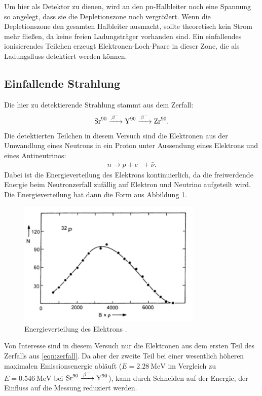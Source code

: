 Um hier als Detektor zu dienen, wird an den pn-Halbleiter noch eine Spannung so angelegt, dass sie die Depletionszone noch vergrößert.
Wenn die Depletionszone den gesamten Halbleiter ausmacht, sollte theoretisch kein Strom mehr fließen, da keine freien Ladungsträger vorhanden sind. Ein einfallendes ionisierendes Teilchen erzeugt Elektronen-Loch-Paare in dieser Zone, die als Ladungsfluss detektiert werden können.

\subsection{Einfallende Strahlung}

Die hier zu detektierende Strahlung stammt aus dem Zerfall:
\begin{align}
  \ce{Sr^{90} ->[$\beta^-$] Y^{90} ->[$\beta^-$] Zr^{90}}. \label{eqn:zerfall}
\end{align}
Die detektierten Teilchen in diesem Versuch sind die Elektronen aus der Umwandlung eines Neutrons in ein Proton unter Aussendung eines Elektrons und eines Antineutrinos:
\begin{align*}
  n \to p + e^- + \bar \nu.
\end{align*}
Dabei ist die Energieverteilung des Elektrons kontinuierlich, da die freiwerdende Energie beim Neutronzerfall zufällig auf Elektron und Neutrino aufgeteilt wird. Die Energieverteilung hat dann die Form aus Abbildung \ref{fig:elektronenergie}.
\begin{figure}
  \centering
  \includegraphics[height=6cm]{TimosAufrisse/elektronenenergie.png}
  \caption{Energieverteilung des Elektrons \cite{anleitung}.}
  \label{fig:elektronenergie}
\end{figure}
Von Interesse sind in diesem Versuch nur die Elektronen aus dem ersten Teil des Zerfalls aus \eqref{eqn:zerfall}. Da aber der zweite
Teil bei einer wesentlich höheren maximalen Emissionsenergie abläuft ($E = \SI{2.28}{\mega\electronvolt}$ im Vergleich zu $E = \SI{0.546}{\mega\electronvolt}$ bei
$\ce{Sr^{90} ->[$\beta^-$] Y^{90}}$), kann durch Schneiden auf der Energie, der Einfluss auf die Messung reduziert werden.

